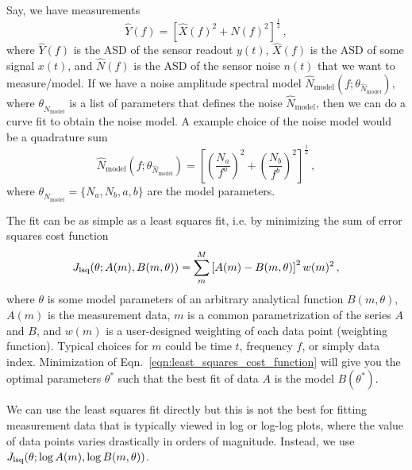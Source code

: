 Say, we have measurements
\begin{equation}
	\hat{Y}(f) = \left[\hat{X}(f)^2 + \hat{N}(f)^2\right]^{\frac{1}{2}}\,,
	\label{eqn:sensor_measurement}
\end{equation}
where $\hat{Y}(f)$ is the ASD of the sensor readout $y(t)$, $\hat{X}(f)$ is the ASD of some signal $x(t)$, and $\hat{N}(f)$ is the ASD of the sensor noise $n(t)$ that we want to measure/model.
If we have a noise amplitude spectral model $\hat{N}_\mathrm{model}(f;\theta_{\hat{N}_\mathrm{model}})$, where $\theta_{\hat{N}_\mathrm{model}}$ is a list of parameters that defines the noise $\hat{N}_\mathrm{model}$, then we can do a curve fit to obtain the noise model.
A example choice of the noise model would be a quadrature sum
\begin{equation}
	\hat{N}_\mathrm{model}(f;\theta_{\hat{N}_\mathrm{model}})=\left[\left(\frac{N_a}{f^a}\right)^2 + \left(\frac{N_b}{f^b}\right)^2\right]^{\frac{1}{2}}\,,
	\label{eqn:noise_model}
\end{equation}
where $\theta_{\hat{N}_\mathrm{model}}=\{N_a,N_b,a,b\}$ are the model parameters.

The fit can be as simple as a least squares fit, i.e. by minimizing the sum of error squares cost function
\begin{equation}
	J_\mathrm{lsq}\mleft(\theta;A(m), B(m,\theta)\mright) = \sum_m^M\left[A(m)-B(m,\theta)\right]^2 w(m)^2\,,
	\label{eqn:least_squares_cost_function}
\end{equation}
where $\theta$ is some model parameters of an arbitrary analytical function $B(m,\theta)$, $A(m)$ is the measurement data, $m$ is a common parametrization of the series $A$ and $B$, and $w(m)$ is a user-designed weighting of each data point (weighting function).
Typical choices for $m$ could be time $t$, frequency $f$, or simply data index.
Minimization of Eqn.~\eqref{eqn:least_squares_cost_function} will give you the optimal parameters $\theta^*$ such that the best fit of data $A$ is the model $B(\theta^*)$.

We can use the least squares fit directly but this is not the best for fitting measurement data that is typically viewed in log or log-log plots, where the value of data points varies drastically in orders of magnitude.
Instead, we use $J_\mathrm{lsq}\mleft(\theta;\log{A(m)}, \log{B(m,\theta)}\mright)$.

